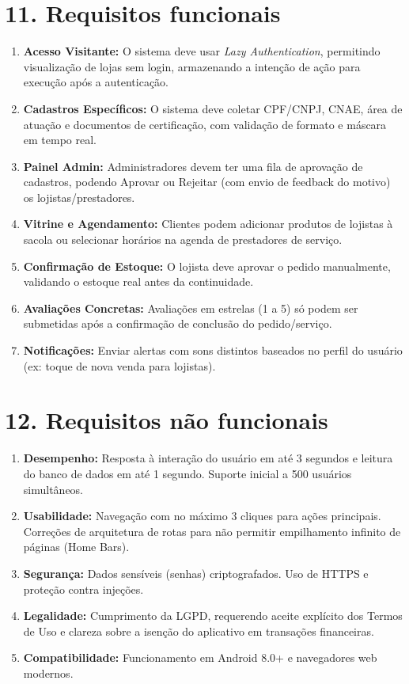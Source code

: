 \documentclass[11pt, a4paper]{article}
\begin{document}
\section*{\textcolor{headerblue}{11. Requisitos funcionais}}
\begin{enumerate}[label=RF-\arabic*.]
    \item \textbf{Acesso Visitante:} O sistema deve usar \textit{Lazy Authentication}, permitindo visualização de lojas sem login, armazenando a intenção de ação para execução após a autenticação.
    \item \textbf{Cadastros Específicos:} O sistema deve coletar CPF/CNPJ, CNAE, área de atuação e documentos de certificação, com validação de formato e máscara em tempo real.
    \item \textbf{Painel Admin:} Administradores devem ter uma fila de aprovação de cadastros, podendo Aprovar ou Rejeitar (com envio de feedback do motivo) os lojistas/prestadores.
    \item \textbf{Vitrine e Agendamento:} Clientes podem adicionar produtos de lojistas à sacola ou selecionar horários na agenda de prestadores de serviço.
    \item \textbf{Confirmação de Estoque:} O lojista deve aprovar o pedido manualmente, validando o estoque real antes da continuidade.
    \item \textbf{Avaliações Concretas:} Avaliações em estrelas (1 a 5) só podem ser submetidas após a confirmação de conclusão do pedido/serviço.
    \item \textbf{Notificações:} Enviar alertas com sons distintos baseados no perfil do usuário (ex: toque de nova venda para lojistas).
\end{enumerate}

\section*{\textcolor{headerblue}{12. Requisitos não funcionais}}
\begin{enumerate}[label=RNF-\arabic*.]
    \item \textbf{Desempenho:} Resposta à interação do usuário em até 3 segundos e leitura do banco de dados em até 1 segundo. Suporte inicial a 500 usuários simultâneos.
    \item \textbf{Usabilidade:} Navegação com no máximo 3 cliques para ações principais. Correções de arquitetura de rotas para não permitir empilhamento infinito de páginas (Home Bars).
    \item \textbf{Segurança:} Dados sensíveis (senhas) criptografados. Uso de HTTPS e proteção contra injeções.
    \item \textbf{Legalidade:} Cumprimento da LGPD, requerendo aceite explícito dos Termos de Uso e clareza sobre a isenção do aplicativo em transações financeiras.
    \item \textbf{Compatibilidade:} Funcionamento em Android 8.0+ e navegadores web modernos.
\end{enumerate}
\end{document}
